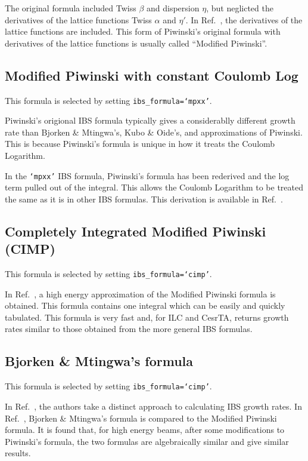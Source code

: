 \documentclass[11pt]{article}
\begin{document}
The original formula included Twiss $\beta$ and dispersion $\eta$, but neglicted
the derivatives of the lattice functions Twiss $\alpha$ and $\eta'$.
In Ref.~\cite{b:martini}, the derivatives of the lattice functions are included.
This form of Piwinski's original formula with derivatives of the lattice
functions is usually called ``Modified Piwinski''.

\subsection{Modified Piwinski with constant Coulomb Log}
This formula is selected by setting {\tt ibs_formula=`mpxx'}.

Piwinski's origional IBS formula typically gives a considerablly different growth rate than
Bjorken \& Mtingwa's, Kubo \& Oide's, and approximations of Piwinski.  This is because
Piwinski's formula is unique in how it treats the Coulomb Logarithm.

In the {\tt `mpxx'} IBS formula, Piwinski's formula has been rederived and the
log term pulled out of the integral.  This allows the Coulomb Logarithm to be treated the
same as it is in other IBS formulas.  This derivation is available in Ref.~\cite{b:ehr-thesis}.

\subsection{Completely Integrated Modified Piwinski (CIMP)}
This formula is selected by setting {\tt ibs_formula=`cimp'}.

In Ref.~\cite{b:wolski}, a high energy approximation of the Modified Piwinski formula is 
obtained.  This formula contains one integral which can be easily and quickly tabulated.
This formula is very fast and, for ILC and CesrTA, returns growth rates similar to those obtained
from the more general IBS formulas.

\subsection{Bjorken \& Mtingwa's formula}
This formula is selected by setting {\tt ibs_formula=`cimp'}.

In Ref.~\cite{b:bjmt}, the authors take a distinct approach to calculating IBS growth rates.
In Ref.~\cite{b:bane-comp}, Bjorken \& Mtingwa's formula is compared to
the Modified Piwinski formula.  It is found that, for high energy beams, after some
modifications to Piwinski's formula, the two formulas are algebraically similar
and give similar results.
\end{document}
